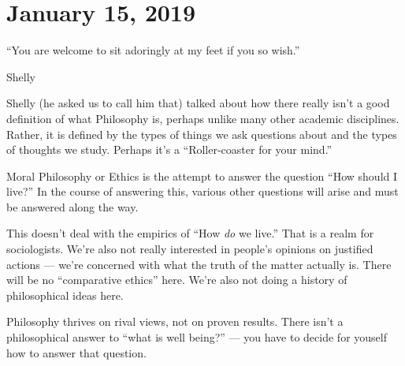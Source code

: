 
\section{January 15, 2019}

\epigraph{``You are welcome to sit adoringly at my feet if you so wish.''}{Shelly}

Shelly (he asked us to call him that) talked about how there really isn't a good definition of what Philosophy is, perhaps unlike many other academic disciplines. Rather, it is defined by the types of things we ask questions about and the types of thoughts we study. Perhaps it's a ``Roller-coaster for your mind.''

\begin{definition}[Ethics]
Moral Philosophy or Ethics is the attempt to answer the question ``How should I live?'' In the course of answering this, various other questions will arise and must be answered along the way.
\end{definition}

This doesn't deal with the empirics of ``How \emph{do} we live.'' That is a realm for sociologists. We're also not really interested in people's opinions on justified actions --- we're concerned with what the truth of the matter actually is. There will be no ``comparative ethics'' here. We're also not doing a history of philosophical ideas here.

Philosophy thrives on rival views, not on proven results. There isn't a philosophical answer to ``what is well being?'' --- you have to decide for youself how to answer that question.
